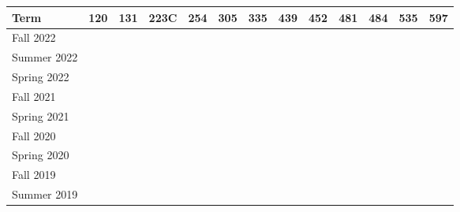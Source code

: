 \documentclass[11pt]{letter}
\newcommand{\ck}{\checkmark}
\begin{document}
  \begin{tabular}{|l|c|c|c|c|c|c|c|c|c|c|c|c|}
  \hline
  \textbf{Term} &
  \textbf{120} &
  \textbf{131} &
  \textbf{223C} &
  \textbf{254} &
  \textbf{305} &
  \textbf{335} &
  \textbf{439} &
  \textbf{452} &
  \textbf{481} &
  \textbf{484} &
  \textbf{535} &
  \textbf{597} \\ \hline

  Fall   2022 &\ck &    &    &    &    &      &    &    &    &    &    &    \\ \hline
  Summer 2022 &    &    &    &    &    &\ck   &    &    &    &    &    &    \\ \hline
  Spring 2022 &    &    &    &    &    &\ck   &    &    &    &    &    &    \\ \hline
  Fall   2021 &    &\ck &    &    &    &    &    &    &    &    &\ck &    \\ \hline
  Spring 2021 &    &    &    &    &    &\ck &\ck &    &    &    &    &    \\ \hline
  Fall   2020 &    &\ck &    &    &    &    &    &    &    &    &\ck &    \\ \hline
  Spring 2020 &\ck &    &    &    &    &    &    &    &    &\ck &    &    \\ \hline
  Fall   2019 &\ck &    &    &    &    &    &    &    &    &    &\ck &    \\ \hline
  Summer 2019 &    &    &    &    &    &\ck &    &    &    &    &    &    \\ \hline

\end{tabular}
\end{document}
